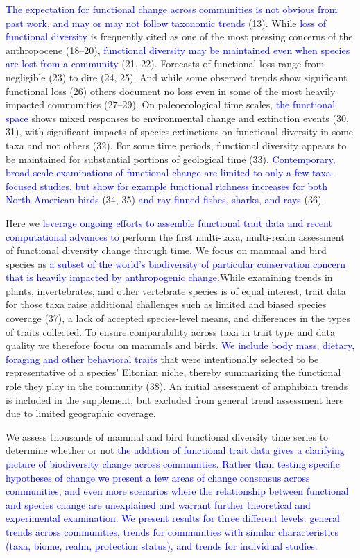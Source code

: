 \documentclass{article}
\begin{document}
\textcolor{blue}{The expectation for functional change across communities is not obvious from past work, and may or may not follow taxonomic trends}
(13). While \textcolor{blue}{loss of functional diversity} is frequently
cited as one of the most pressing concerns of the anthropocene (18--20),
\textcolor{blue}{functional diversity may be maintained even when species are lost from a community}
(21, 22). Forecasts of functional loss range from negligible (23) to
dire (24, 25). And while some observed trends show significant
functional loss (26) others document no loss even in some of the most
heavily impacted communities (27--29). On paleoecological time scales,
\textcolor{blue}{the functional space} shows mixed responses to
environmental change and extinction events (30, 31), with significant
impacts of species extinctions on functional diversity in some taxa and
not others (32). For some time periods, functional diversity appears to
be maintained for substantial portions of geological time (33).
\textcolor{blue}{Contemporary, broad-scale examinations of functional change are limited to only a few taxa-focused studies, but show for example functional richness increases for both North American birds}
(34, 35) \textcolor{blue}{and ray-finned fishes, sharks, and rays} (36).

Here we
\textcolor{blue}{leverage ongoing efforts to assemble functional trait data and recent computational advances to}
perform the first multi-taxa, multi-realm assessment of functional
diversity change through time. We focus on mammal and bird species as
\textcolor{blue}{a subset of the world's biodiversity of particular conservation concern that is heavily impacted by anthropogenic change.}While
examining trends in plants, invertebrates, and other vertebrate species
is of equal interest, trait data for those taxa raise additional
challenges such as limited and biased species coverage (37), a lack of
accepted species-level means, and differences in the types of traits
collected. To ensure comparability across taxa in trait type and data
quality we therefore focus on mammals and birds.
\textcolor{blue}{We include body mass, dietary, foraging and other behavioral traits}
that were intentionally selected to be representative of a species'
Eltonian niche, thereby summarizing the functional role they play in the
community (38). An initial assessment of amphibian trends is included in
the supplement, but excluded from general trend assessment here due to
limited geographic coverage.

We assess thousands of mammal and bird functional diversity time series
to determine whether or not
\textcolor{blue}{the addition of functional trait data gives a clarifying picture of biodiversity change across communities. Rather than testing specific hypotheses of change we present a few areas of change consensus across communities, and even more scenarios where the relationship between functional and species change are unexplained and warrant further theoretical and experimental examination. We present results for three different levels: general trends across communities, trends for communities with similar characteristics (taxa, biome, realm, protection status), and trends for individual studies.}
\end{document}
